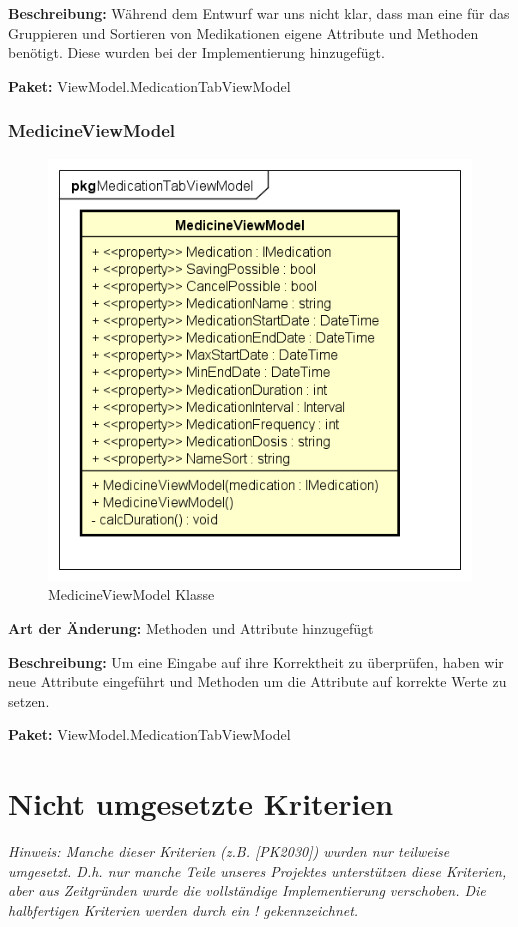 \documentclass[a4paper]{scrreprt}
\begin{document}
\textbf{Beschreibung:}  Während dem Entwurf war uns nicht klar, dass man eine für das Gruppieren und Sortieren von Medikationen eigene Attribute und Methoden benötigt. Diese wurden bei der Implementierung hinzugefügt.

\textbf{Paket:} ViewModel.MedicationTabViewModel

\subsubsection{MedicineViewModel}
\begin{figure}[H]
\centering
\includegraphics[width=0.45\textheight]{graphics/Klassendiagramme/ViewModel/MedicineViewModel}
\caption{MedicineViewModel Klasse}
\end{figure}
\textbf{Art der Änderung:} Methoden und Attribute hinzugefügt

\textbf{Beschreibung:}  Um eine Eingabe auf ihre Korrektheit zu überprüfen, haben wir neue Attribute eingeführt und Methoden um die Attribute auf korrekte Werte zu setzen.

\textbf{Paket:} ViewModel.MedicationTabViewModel

\section{Nicht umgesetzte Kriterien}
\textit{Hinweis: Manche dieser Kriterien (z.B. [PK2030]) wurden nur teilweise umgesetzt. D.h. nur manche Teile unseres Projektes unterstützen diese Kriterien, aber aus Zeitgründen wurde die vollständige Implementierung verschoben. Die halbfertigen Kriterien werden durch ein \dq{}!\dq{} gekennzeichnet.}
\end{document}
